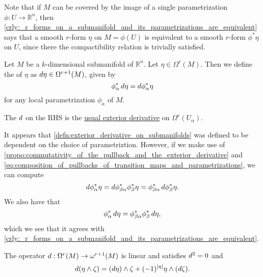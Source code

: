 \documentclass[notoc,notitlepage]{tufte-book}
\begin{document}
\begin{remark}
  Note that if $M$ can be covered by the image of a single parametrization $\phi
  : U \to \mathbb{R}^n$, then
  \cref{crly:_r_forms_on_a_submanifold_and_its_parametrizations_are_equivalent}
  says that a smooth $r$-form $\eta$ on $M  = \phi(U)$ is equivalent to a smooth
  $r$-form $\phi^* \eta$ on $U$, since there the compactibility relation is
  trivially satisfied.
\end{remark}

\begin{defn}\label{defn:exterior_derivative_on_submanifolds}
  Let $M$ be a $k$-dimensional submanifold of $\mathbb{R}^n$. Let $\eta \in
  \Omega^r(M)$. Then we define the  of $\eta$ as
  $\mathop{}\!d{\eta} \in \Omega^{r+1}(M)$, given by
  \begin{equation}\label{eq:exterior_derivative_on_submanifolds}
    \phi_\alpha^* \mathop{}\!d{\eta} = \mathop{}\!d{\phi_\alpha^* \eta}
  \end{equation}
  for any local parametrization $\phi_\alpha$ of $M$.
\end{defn}

\begin{note}
  The $\mathop{}\!d{}$ on the RHS is the \hyperref[defn:exterior_derivative]{usual
  exterior derivative} on $\Omega^r(U_\alpha)$.
\end{note}

\begin{remark}
  It appears that \cref{defn:exterior_derivative_on_submanifolds} was defined to
  be dependent on the choice of parametriztion. However, if we make use of
  \cref{propo:commutativity_of_the_pullback_and_the_exterior_derivative} and
  \cref{eq:composition_of_pullbacks_of_transition_maps_and_parametrizations}, we
  can compute
  \begin{equation*}
    \mathop{}\!d{\phi_\alpha^* \eta} = \mathop{}\!d{\phi_{\beta\alpha}^* \phi_\beta^* \eta}
    = \phi_{\beta\alpha}^* \mathop{}\!d{\phi_\beta^* \eta}.
  \end{equation*}
  We also have that
  \begin{equation*}
    \phi_\alpha^* \mathop{}\!d{\eta} = \phi_{\beta\alpha}^* \phi_{\beta}^* \mathop{}\!d{\eta},
  \end{equation*}
  which we see that it agrees with
  \cref{crly:_r_forms_on_a_submanifold_and_its_parametrizations_are_equivalent}.
\end{remark}

\begin{propo}\label{propo:square_of_the_exterior_derivative_is_a_zero_map_on_submanifolds}
  The operator $\mathop{}\!d{} : \Omega^r(M) \to \omega^{r+1}(M)$ is linear and
  satisfies $\mathop{}\!d{^2} = 0$ and
  \begin{equation*}
    \mathop{}\!d{(\eta \land \zeta)} = (\mathop{}\!d{\eta}) \land \zeta + (-1)^{\left|\eta\right|} \eta
    \land (\mathop{}\!d{\zeta}).
  \end{equation*}
\end{propo}
\end{document}
